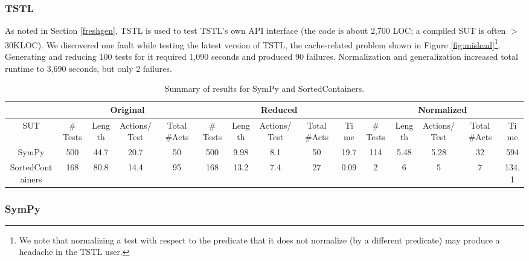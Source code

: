 \subsubsection{TSTL}

As noted in Section \ref{freshgen}, TSTL is used to test TSTL's own
API interface (the code is about 2,700 LOC; a compiled SUT is
often $>$ 30KLOC).  We discovered one fault while testing
the latest version of TSTL, the cache-related problem shown in Figure
\ref{fig:mislead}\footnote{We note that normalizing a test with
  respect to the predicate that it does not normalize (by a different
  predicate) may produce a headache in the TSTL user.}.
Generating and reducing 100 tests for it required 1,090 seconds
and produced 90 failures.  Normalization and generalization
increased total runtime to 3,690 seconds, but only 2
failures.


\begin{table}
{\scriptsize
\begin{tabular}{c|cccc|ccccc|ccccc}
& \multicolumn{4}{c|}{Original} & \multicolumn{5}{c|}{Reduced} &
                                                               \multicolumn{5}{c}{Normalized}
  \\
\hline
SUT & \# Tests & Length & Actions/Test & Total \#Acts & \# Tests & Length
                                     & Actions/Test & Total \#Acts
  & Time  & \# Tests & Length & Actions/Test & Total \#Acts & Time \\
\hline
SymPy & 500 & 44.7 & 20.7& 50 & 500 & 9.98 & 8.1 & 50 & 19.7 & 114 &
                                                                     5.48
  & 5.28 & 32 & 594 \\
SortedContainers & 168 & 80.8 & 14.4 & 95 & 168 & 13.2 & 7.4 & 27 & 0.09 & 2 & 6
                              & 5 & 7 & 134.1 \\
\hline
\end{tabular}
}
\caption{Summary of results for SymPy and SortedContainers.}
\label{sumreduction}
\end{table}

\subsubsection{SymPy}


